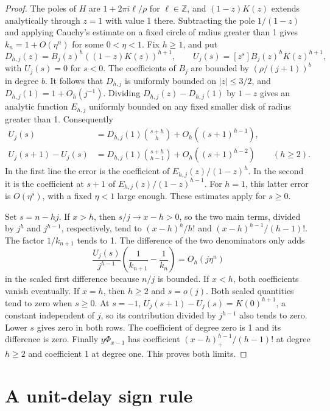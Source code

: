 \documentclass[11pt]{article}
\begin{document}
\begin{proof}
The poles of \(H\) are \(1+2\pi i\ell/\rho\) for \(\ell\in\mathbb Z\), and \((1-z)K(z)\) extends analytically through \(z=1\) with value 1 there. Subtracting the pole \(1/(1-z)\) and applying Cauchy's estimate on a fixed circle of radius greater than 1 gives \(k_n=1+O(\eta^n)\) for some \(0<\eta<1\). Fix \(h\ge1\), and put
\[
 D_{h,j}(z)=B_j(z)^h((1-z)K(z))^{h+1},\qquad
 U_j(s)=[z^s]B_j(z)^h K(z)^{h+1},
\]
with \(U_j(s)=0\) for \(s<0\). The coefficients of \(B_j\) are bounded by \((\rho/(j+1))^b\) in degree \(b\). It follows that \(D_{h,j}\) is uniformly bounded on \(|z|\le 3/2\), and \(D_{h,j}(1)=1+O_h(j^{-1})\). Dividing \(D_{h,j}(z)-D_{h,j}(1)\) by \(1-z\) gives an analytic function \(E_{h,j}\) uniformly bounded on any fixed smaller disk of radius greater than 1. Consequently
\[
 \begin{aligned}
 U_j(s)
   &=D_{h,j}(1)\binom{s+h}{h}+O_h((s+1)^{h-1}),\\
 U_j(s+1)-U_j(s)
   &=D_{h,j}(1)\binom{s+h}{h-1}+O_h((s+1)^{h-2})
       \qquad(h\ge2).
 \end{aligned}
\]
In the first line the error is the coefficient of \(E_{h,j}(z)/(1-z)^h\). In the second it is the coefficient at \(s+1\) of \(E_{h,j}(z)/(1-z)^{h-1}\). For \(h=1\), this latter error is \(O(\eta^s)\), with a fixed \(\eta<1\) large enough. These estimates apply for \(s\ge0\).

Set \(s=n-hj\). If \(x>h\), then \(s/j\to x-h>0\), so the two main terms, divided by \(j^h\) and \(j^{h-1}\), respectively, tend to \((x-h)^h/h!\) and \((x-h)^{h-1}/(h-1)!\). The factor \(1/k_{n+1}\) tends to 1. The difference of the two denominators only adds
\[
 \frac{U_j(s)}{j^{h-1}}\left(\frac{1}{k_{n+1}}-\frac{1}{k_n}\right)
 =O_h(j\eta^n)
\]
in the scaled first difference because \(n/j\) is bounded. If \(x<h\), both coefficients vanish eventually. If \(x=h\), then \(h\ge2\) and \(s=o(j)\). Both scaled quantities tend to zero when \(s\ge0\). At \(s=-1\), \(U_j(s+1)-U_j(s)=K(0)^{h+1}\), a constant independent of \(j\), so its contribution divided by \(j^{h-1}\) also tends to zero. Lower \(s\) gives zero in both rows. The coefficient of degree zero is 1 and its difference is zero. Finally \(y\Phi_{x-1}\) has coefficient \((x-h)_+^{h-1}/(h-1)!\) at degree \(h\ge2\) and coefficient 1 at degree one. This proves both limits.
\end{proof}

\section{A unit-delay sign rule}
\end{document}
